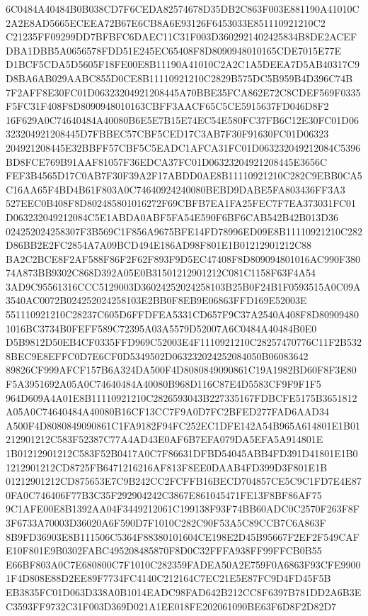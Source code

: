 \documentclass[UTF8,fontset=fandol,zihao=-4,a4paper]{ctexart}
\begin{document}
{{6C0484A40484B0B038CD7F6CEDA82574678D35DB2C863F003E881190A41010C2A2E8AD5665ECEEA72B67E6CB8A6E93126F6453033E851110921210C2
C21235FF09299DD7BFBFC6DAEC11C31F003D3602921402425834B8DE2ACEFDBA1DBB5A0656578FDD51E245EC65408F8D8090948010165CDE7015E77E
D1BCF5CDA5D5605F18FE00E8B11190A41010C2A2C1A5DEEA7D5AB40317C9D8BA6AB029AABC855D0CE8B11110921210C2829B575DC5B959B4D396C74B
7F2AFF8E30FC01D06323204921208445A70BBE35FCA862E72C8CDEF569F0335F5FC31F408F8D8090948010163CBFF3AACF65C5CE5915637FD046D8F2
16F629A0C74640484A40080B6E5E7B15E74EC54E580FC37FB6C12E30FC01D06323204921208445D7FBBEC57CBF5CED17C3AB7F30F91630FC01D06323
204921208445E32BBFF57CBF5C5EADC1AFCA31FC01D063232049212084C5396BD8FCE769B91AAF81057F36EDCA37FC01D06323204921208445E3656C
FEF3B4565D17C0AB7F30F39A2F17ABDD0AE8B11110921210C282C9EBB0CA5C16AA65F4BD4B61F803A0C74640924240080BEBD9DABE5FA803436FF3A3
527EEC0B408F8D802485801016272F69CBFB7EA1FA25FEC7F7EA373031FC01D063232049212084C5E1ABDA0ABF5FA54E590F6BF6CAB542B42B013D36
024252024258307F3B569C1F856A9675BFE14FD78996ED09E8B11110921210C282D86BB2E2FC2854A7A09BCD494E186AD98F801E1B01212901212C88
BA2C2BCE8F2AF588F86F2F62F893F9D5EC47408F8D809094801016AC990F38074A873BB9302C868D392A05E0B31501212901212C081C1158F63F4A54
3AD9C95561316CCC5129003D36024252024258103B25B0F24B1F0593515A0C09A3540AC0072B024252024258103E2BB0F8EB9E06863FFD169E52003E
551110921210C28237C605D6FFDFEA5331CD657F9C37A2540A408F8D809094801016BC3734B0FEFF589C72395A03A5579D52007A6C0484A40484B0E0
D5B9812D50EB4CF0335FFD969C52003E4F1110921210C28257470776C11F2B5328BEC9E8EFFC0D7E6CF0D5349502D063232024252084050B06083642
89826CF999AFCF157B6A324DA500F4D8080849090861C19A1982BD60F8F3E80F5A3951692A05A0C74640484A40080B968D116C87E4D5583CF9F9F1F5
964D609A4A01E8B11110921210C2826593043B227335167FDBCFE5175B3651812A05A0C74640484A40080B16CF13CC7F9A0D7FC2BFED277FAD6AAD34
A500F4D8080849090861C1FA9182F94FC252EC1DFE142A54B965A614801E1B01212901212C583F52387C77A4AD43E0AF6B7EFA079DA5EFA5A914801E
1B01212901212C583F52B0417A0C7F86631DFBD54045ABB4FD391D41801E1B01212901212CD8725FB6471216216AF813F8EE0DAAB4FD399D3F801E1B
01212901212CD875653E7C9B242CC2FCFFB16BECD704857CE5C9C1FD7E4E870FA0C746406F77B3C35F292904242C3867E861045471FE13F8BF86AF75
9C1AFE00E8B1392AA04F3449212061C199138F93F74BB60ADC0C2570F263F8F3F6733A70003D36020A6F590D7F1010C282C90F53A5C89CCB7C6A863F
8B9FD36903E8B111506C5364F88380101604CE198E2D45B95667F2EF2F549CAFE10F801E9B0302FABC495208485870F8D0C32FFFA938FF99FFCB0B55
E66BF803A0C7E680800C7F1010C282359FADEA50A2E759F0A6863F93CFE99001F4D808E88D2EE89F7734FC4140C212164C7EC21E5E87FC9D4FD45F5B
EB3835FC01D063D338A0B1014EADC98FAD642B212CC8F6397B781DD2A6B3EC3593FF9732C31F003D369D021A1EE018FE202061090BE63F6D8F2D82D7
}}
\end{document}
